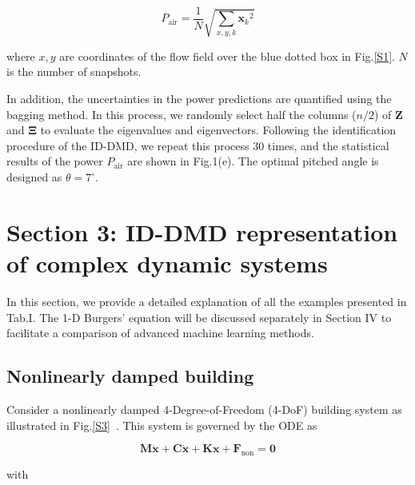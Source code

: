 \begin{equation}
    {P}_\text{air}=\frac{1}{N}\sqrt{\sum\limits_{x,y,k}{{\mathbf{x}_{k}}^{2}}} \label{eqS20}
\end{equation}

\noindent where $x,y$ are coordinates of the flow field over the blue dotted box in Fig.\ref{S1}. $N$ is the number of snapshots.

In addition, the uncertainties in the power predictions are quantified using the bagging method. In this process, we randomly select half the columns ($n/2$) of $\mathbf{Z}$ and $\mathbf{\Xi}$ to evaluate the eigenvalues and eigenvectors. Following the identification procedure of the ID-DMD, we repeat this process 30 times, and the statistical results of the power ${P}_\text{air}$ are shown in Fig.1(e). The optimal pitched angle is designed as $\theta =7^\circ$.

\section{Section 3: ID-DMD representation of complex dynamic systems}

In this section, we provide a detailed explanation of all the examples presented in Tab.I. The 1-D Burgers' equation will be discussed separately in Section IV to facilitate a comparison of advanced machine learning methods.

\subsection{Nonlinearly damped building}
Consider a nonlinearly damped 4-Degree-of-Freedom (4-DoF) building system as illustrated in Fig.\ref{S3}~\cite{zhu2022design}. This system is governed by the ODE as 

\begin{equation}
    \mathbf{M\ddot{x}}+ \mathbf{C\dot{x}}+\mathbf{Kx}+{{\mathbf{F}}_{\text{non}}}=\mathbf{0}  \label{eqS21}
\end{equation}

\noindent with

